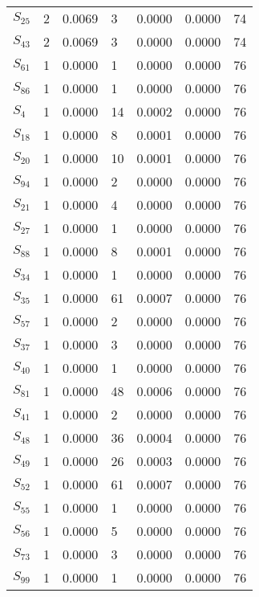\begin{xltabular}{\textwidth}{XPPPPPP}
  $S_{25}$ & 2 & 0.0069 & 3 & 0.0000 & 0.0000 & 74 \\ 
  $S_{43}$ & 2 & 0.0069 & 3 & 0.0000 & 0.0000 & 74 \\ 
  $S_{61}$ & 1 & 0.0000 & 1 & 0.0000 & 0.0000 & 76 \\ 
  $S_{86}$ & 1 & 0.0000 & 1 & 0.0000 & 0.0000 & 76 \\ 
  $S_{4}$ & 1 & 0.0000 & 14 & 0.0002 & 0.0000 & 76 \\ 
  $S_{18}$ & 1 & 0.0000 & 8 & 0.0001 & 0.0000 & 76 \\ 
  $S_{20}$ & 1 & 0.0000 & 10 & 0.0001 & 0.0000 & 76 \\ 
  $S_{94}$ & 1 & 0.0000 & 2 & 0.0000 & 0.0000 & 76 \\ 
  $S_{21}$ & 1 & 0.0000 & 4 & 0.0000 & 0.0000 & 76 \\ 
  $S_{27}$ & 1 & 0.0000 & 1 & 0.0000 & 0.0000 & 76 \\ 
  $S_{88}$ & 1 & 0.0000 & 8 & 0.0001 & 0.0000 & 76 \\ 
  $S_{34}$ & 1 & 0.0000 & 1 & 0.0000 & 0.0000 & 76 \\ 
  $S_{35}$ & 1 & 0.0000 & 61 & 0.0007 & 0.0000 & 76 \\ 
  $S_{57}$ & 1 & 0.0000 & 2 & 0.0000 & 0.0000 & 76 \\ 
  $S_{37}$ & 1 & 0.0000 & 3 & 0.0000 & 0.0000 & 76 \\ 
  $S_{40}$ & 1 & 0.0000 & 1 & 0.0000 & 0.0000 & 76 \\ 
  $S_{81}$ & 1 & 0.0000 & 48 & 0.0006 & 0.0000 & 76 \\ 
  $S_{41}$ & 1 & 0.0000 & 2 & 0.0000 & 0.0000 & 76 \\ 
  $S_{48}$ & 1 & 0.0000 & 36 & 0.0004 & 0.0000 & 76 \\ 
  $S_{49}$ & 1 & 0.0000 & 26 & 0.0003 & 0.0000 & 76 \\ 
  $S_{52}$ & 1 & 0.0000 & 61 & 0.0007 & 0.0000 & 76 \\ 
  $S_{55}$ & 1 & 0.0000 & 1 & 0.0000 & 0.0000 & 76 \\ 
  $S_{56}$ & 1 & 0.0000 & 5 & 0.0000 & 0.0000 & 76 \\ 
  $S_{73}$ & 1 & 0.0000 & 3 & 0.0000 & 0.0000 & 76 \\ 
  $S_{99}$ & 1 & 0.0000 & 1 & 0.0000 & 0.0000 & 76 \\
        \bottomrule
    \end{xltabular}
    